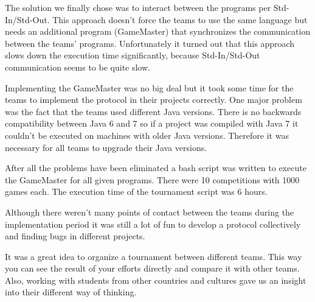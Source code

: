 The solution we finally chose was to interact between the programs per Std-In/Std-Out. This approach doesn't force the teams to use the same language but needs an additional program (GameMaster) that synchronizes the communication between the teams' programs. Unfortunately it turned out that this approach slows down the execution time significantly, because Std-In/Std-Out communication seems to be quite slow.

Implementing the GameMaster was no big deal but it took some time for the teams to implement the protocol in their projects correctly. One major problem was the fact that the teams used different Java versions. There is no backwards compatibility between Java 6 and 7 so if a project was compiled with Java 7 it couldn't be executed on machines with older Java versions. Therefore it was necessary for all teams to upgrade their Java versions.

After all the problems have been eliminated a bash script was written to execute the GameMaster for all given programs. There were 10 competitions with 1000 games each. The execution time of the tournament script was 6 hours.

Although there weren't many points of contact between the teams during the implementation period it was still a lot of fun to develop a protocol collectively and finding bugs in different projects.

It was a great idea to organize a tournament between different teams. This way you can see the result of your efforts directly and compare it with other teams. Also, working with students from other countries and cultures gave us an insight into their different way of thinking.
